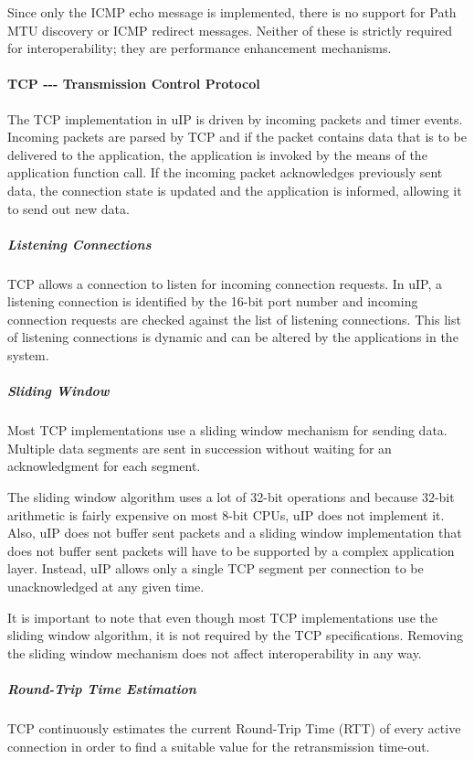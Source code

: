 Since only the I\+C\+MP echo message is implemented, there is no support for Path M\+TU discovery or I\+C\+MP redirect messages. Neither of these is strictly required for interoperability; they are performance enhancement mechanisms.\hypertarget{a00074_tcp}{}\paragraph{T\+C\+P -\/-\/-\/ Transmission Control Protocol}\label{a00074_tcp}
The T\+CP implementation in u\+IP is driven by incoming packets and timer events. Incoming packets are parsed by T\+CP and if the packet contains data that is to be delivered to the application, the application is invoked by the means of the application function call. If the incoming packet acknowledges previously sent data, the connection state is updated and the application is informed, allowing it to send out new data.\hypertarget{a00074_listeb}{}\subparagraph{Listening Connections}\label{a00074_listeb}
T\+CP allows a connection to listen for incoming connection requests. In u\+IP, a listening connection is identified by the 16-\/bit port number and incoming connection requests are checked against the list of listening connections. This list of listening connections is dynamic and can be altered by the applications in the system.\hypertarget{a00074_slidingwindow}{}\subparagraph{Sliding Window}\label{a00074_slidingwindow}
Most T\+CP implementations use a sliding window mechanism for sending data. Multiple data segments are sent in succession without waiting for an acknowledgment for each segment.

The sliding window algorithm uses a lot of 32-\/bit operations and because 32-\/bit arithmetic is fairly expensive on most 8-\/bit C\+P\+Us, u\+IP does not implement it. Also, u\+IP does not buffer sent packets and a sliding window implementation that does not buffer sent packets will have to be supported by a complex application layer. Instead, u\+IP allows only a single T\+CP segment per connection to be unacknowledged at any given time.

It is important to note that even though most T\+CP implementations use the sliding window algorithm, it is not required by the T\+CP specifications. Removing the sliding window mechanism does not affect interoperability in any way.\hypertarget{a00074_rttest}{}\subparagraph{Round-\/\+Trip Time Estimation}\label{a00074_rttest}
T\+CP continuously estimates the current Round-\/\+Trip Time (R\+TT) of every active connection in order to find a suitable value for the retransmission time-\/out.

